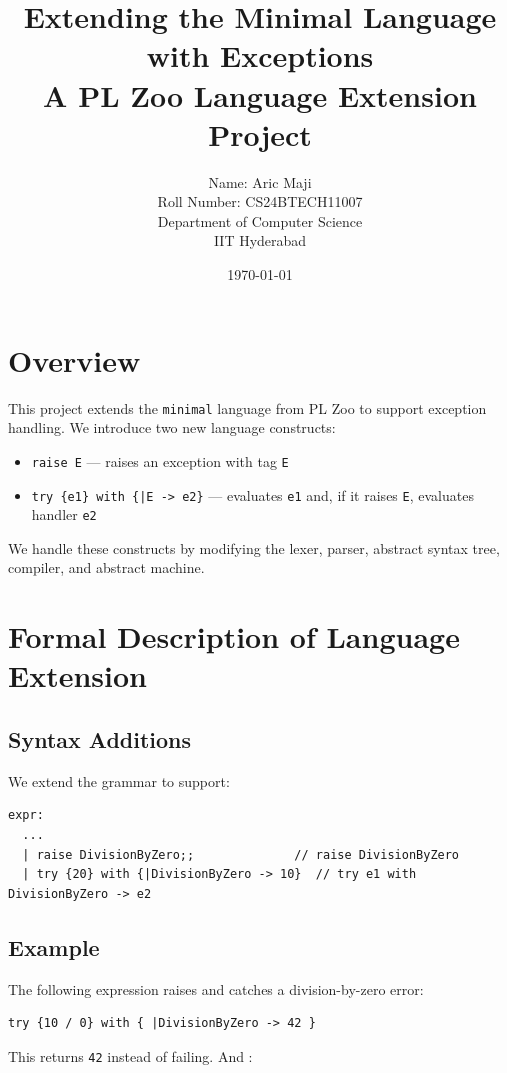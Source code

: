 \documentclass[11pt]{article}
\title{Extending the Minimal Language with Exceptions\\[0.5em]
\large A PL Zoo Language Extension Project}
\author{
  Name: Aric Maji \\
  Roll Number: CS24BTECH11007 \\
  Department of Computer Science \\
  IIT Hyderabad
}
\date{\today}
\begin{document}
\maketitle

\section{Overview}

This project extends the \texttt{minimal} language from PL Zoo to support exception handling. We introduce two new language constructs:
\begin{itemize}[itemsep=0.5em]
  \item \texttt{raise E} — raises an exception with tag \texttt{E}
  \item \texttt{try \{e1\} with \{|E -> e2\}} — evaluates \texttt{e1} and, if it raises \texttt{E}, evaluates handler \texttt{e2}
\end{itemize}

We handle these constructs by modifying the lexer, parser, abstract syntax tree, compiler, and abstract machine.

\section{Formal Description of Language Extension}

\subsection{Syntax Additions}

We extend the grammar to support:
\begin{lstlisting}
expr:
  ...
  | raise DivisionByZero;;              // raise DivisionByZero
  | try {20} with {|DivisionByZero -> 10}  // try e1 with DivisionByZero -> e2
\end{lstlisting}

\subsection{Example}

The following expression raises and catches a division-by-zero error:

\begin{lstlisting}
try {10 / 0} with { |DivisionByZero -> 42 }
\end{lstlisting}

This returns \texttt{42} instead of failing. And :
\end{document}
